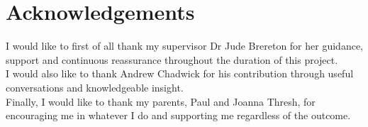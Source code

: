 \documentclass[../../main.tex]{subfiles}
\begin{document}
\clearpage
\thispagestyle{empty}

	\section*{Acknowledgements}

	\begin{center}
	\begin{minipage}{0.7\textwidth}
	\centering
	I would like to first of all thank my supervisor Dr Jude Brereton for her guidance, support and continuous reassurance throughout the duration of this project.\\
	\vspace{5mm}
	I would also like to thank Andrew Chadwick for his contribution through useful conversations and knowledgeable insight.\\
	\vspace{5mm}
	Finally, I would like to thank my parents, Paul and Joanna Thresh, for encouraging me in whatever I do and supporting me regardless of the outcome.
	
	\end{minipage}
	\end{center}
\end{document}
